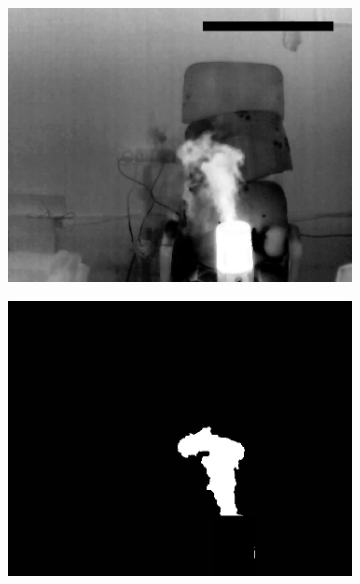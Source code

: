 \documentclass[14pt, a4paper]{extreport}
\begin{document}
\begin{figure}[h!]
\begin{subfigure}{.32\textwidth}
			\centering
			\includegraphics[width = \textwidth]{image/chapter_3/examples/tep/185}
		\end{subfigure}
		\begin{subfigure}{.32\textwidth}
			\centering
			\includegraphics[width = \textwidth]{image/chapter_3/examples/mask/185}
		\end{subfigure}
		\begin{subfigure}{.32\textwidth}
			\centering

\end{subfigure}
\end{figure}
\end{document}
